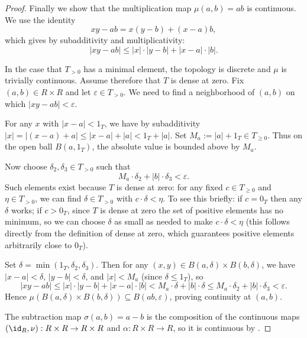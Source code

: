 \begin{proof}
    Finally we show that the multiplication map $\mu(a,b) = ab$ is continuous. We use the identity
    $$xy - ab = x(y-b) + (x-a)b,$$
    which gives by subadditivity and multiplicativity:
    $$|xy - ab| \leq |x| \cdot |y-b| + |x-a| \cdot |b|.$$

    In the case that $T_{>0}$ has a minimal element, the topology is discrete and $\mu$ is trivially continuous. Assume therefore that $T$ is dense at zero. Fix $(a,b) \in R \times R$ and let $\varepsilon \in T_{>0}$. We need to find a neighborhood of $(a,b)$ on which $|xy - ab| < \varepsilon$.

    For any $x$ with $|x-a| < 1_T$, we have by subadditivity $|x| = |(x-a)+a| \leq |x-a| + |a| < 1_T + |a|$. Set $M_a := |a| + 1_T \in T_{\geq 0}$. Thus on the open ball $B(a, 1_T)$, the absolute value is bounded above by $M_a$.

    Now choose $\delta_2, \delta_3 \in T_{>0}$ such that
    $$M_a \cdot \delta_2 + |b| \cdot \delta_3 < \varepsilon.$$
    Such elements exist because $T$ is dense at zero: for any fixed $c \in T_{\geq 0}$ and $\eta \in T_{>0}$, we can find $\delta \in T_{>0}$ with $c \cdot \delta < \eta$. To see this briefly: if $c = 0_T$ then any $\delta$ works; if $c > 0_T$, since $T$ is dense at zero the set of positive elements has no minimum, so we can choose $\delta$ as small as needed to make $c \cdot \delta < \eta$ (this follows directly from the definition of dense at zero, which guarantees positive elements arbitrarily close to $0_T$).

    Set $\delta = \min(1_T, \delta_2, \delta_3)$. Then for any $(x,y) \in B(a, \delta) \times B(b, \delta)$, we have $|x-a| < \delta$, $|y-b| < \delta$, and $|x| < M_a$ (since $\delta \leq 1_T$), so
    $$|xy - ab| \leq |x| \cdot |y-b| + |x-a| \cdot |b| < M_a \cdot \delta + |b| \cdot \delta \leq M_a \cdot \delta_2 + |b| \cdot \delta_3 < \varepsilon.$$
    Hence $\mu(B(a, \delta) \times B(b, \delta)) \subseteq B(ab, \varepsilon)$, proving continuity at $(a,b)$.

    The subtraction map $\sigma(a,b) = a - b$ is the composition of the continuous maps $(\id_R, \nu) : R \times R \to R \times R$ and $\alpha : R \times R \to R$, so it is continuous by .
\end{proof}
